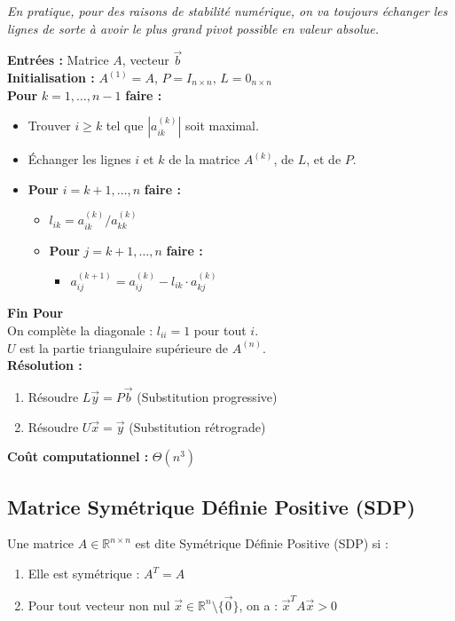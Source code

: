 \textit{En pratique, pour des raisons de stabilité numérique, on va toujours échanger les lignes de sorte à avoir le plus grand pivot possible en valeur absolue.}

\begin{algorithme}
\textbf{Entrées :} Matrice $A$, vecteur $\vec{b}$ \\
\textbf{Initialisation :} $A^{(1)} = A$, $P = I_{n \times n}$, $L = 0_{n \times n}$ \\
\textbf{Pour} $k = 1, \dots, n-1$ \textbf{faire :}
\begin{itemize}
    \item Trouver $i \ge k$ tel que $|a_{ik}^{(k)}|$ soit maximal.
    \item Échanger les lignes $i$ et $k$ de la matrice $A^{(k)}$, de $L$, et de $P$.
    \item \textbf{Pour} $i = k+1, \dots, n$ \textbf{faire :}
    \begin{itemize}
        \item $l_{ik} = a_{ik}^{(k)} / a_{kk}^{(k)}$
        \item \textbf{Pour} $j = k+1, \dots, n$ \textbf{faire :}
        \begin{itemize}
            \item $a_{ij}^{(k+1)} = a_{ij}^{(k)} - l_{ik} \cdot a_{kj}^{(k)}$
        \end{itemize}
    \end{itemize}
\end{itemize}
\textbf{Fin Pour} \\
On complète la diagonale : $l_{ii} = 1$ pour tout $i$. \\
$U$ est la partie triangulaire supérieure de $A^{(n)}$. \\
\textbf{Résolution :}
\begin{enumerate}
    \item Résoudre $L\vec{y} = P\vec{b}$ (Substitution progressive)
    \item Résoudre $U\vec{x} = \vec{y}$ (Substitution rétrograde)
\end{enumerate}
\textbf{Coût computationnel :} $\Theta(n^3)$
\end{algorithme}

\subsection{Matrice Symétrique Définie Positive (SDP)}

\begin{definition}
Une matrice $A \in \mathbb{R}^{n \times n}$ est dite Symétrique Définie Positive (SDP) si :
\begin{enumerate}
    \item Elle est symétrique : $A^T = A$
    \item Pour tout vecteur non nul $\vec{x} \in \mathbb{R}^n \setminus \{\vec{0}\}$, on a : $\vec{x}^T A \vec{x} > 0$
\end{enumerate}
\end{definition}

